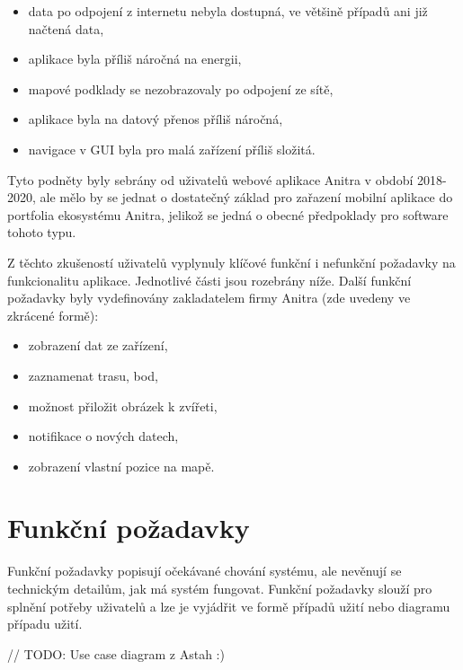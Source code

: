 \begin{itemize}
	\item data po odpojení z internetu nebyla dostupná, ve většině případů ani již načtená data,
	\item aplikace byla příliš náročná na energii,
	\item mapové podklady se nezobrazovaly po odpojení ze sítě,
	\item aplikace byla na datový přenos příliš náročná,
	\item navigace v GUI byla pro malá zařízení příliš složitá.
\end{itemize}

Tyto podněty byly sebrány od uživatelů webové aplikace Anitra v období 2018-2020, ale mělo by se jednat o dostatečný základ pro zařazení mobilní aplikace do portfolia ekosystému Anitra, jelikož se jedná o obecné předpoklady pro software tohoto typu.

Z těchto zkušeností uživatelů vyplynuly klíčové funkční i nefunkční požadavky na funkcionalitu aplikace. Jednotlivé části jsou rozebrány níže. Další funkční požadavky byly vydefinovány zakladatelem firmy Anitra (zde uvedeny ve zkrácené formě):

\begin{itemize}
	\item zobrazení dat ze zařízení,
	\item zaznamenat trasu, bod,
	\item možnost přiložit obrázek k zvířeti,
	\item notifikace o nových datech,
	\item zobrazení vlastní pozice na mapě.
\end{itemize}

\section{Funkční požadavky}



Funkční požadavky popisují očekávané chování systému, ale nevěnují se technickým detailům, jak má systém fungovat. Funkční požadavky slouží pro splnění potřeby uživatelů a lze je vyjádřit ve formě případů užití nebo diagramu případu užití. 

// TODO: Use case diagram z Astah :)

